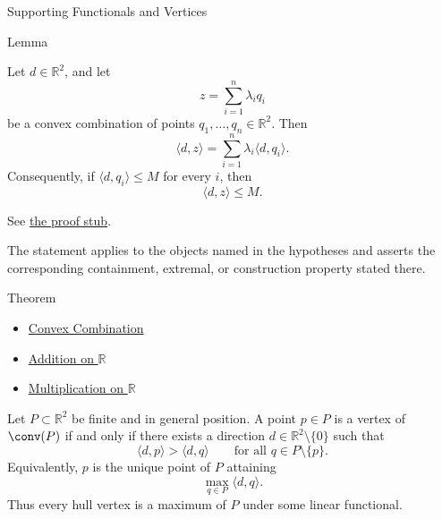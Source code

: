 \begin{topicbox}{Supporting Functionals and Vertices}
\NoLocalDependencies

\begin{lemmabox}{Lemma}
\begin{lemma}
\label{lem:computational-geometry-linear-functionals-convex-combinations}
Let \(d\in\mathbb{R}^2\), and let
\[
  z=\sum_{i=1}^{n}\lambda_i q_i
\]
be a convex combination of points \(q_1,\dots,q_n\in\mathbb{R}^2\). Then
\[
  \langle d,z\rangle
  =
  \sum_{i=1}^{n}\lambda_i\langle d,q_i\rangle.
\]
Consequently, if \(\langle d,q_i\rangle\le M\) for every \(i\), then
\[
  \langle d,z\rangle\le M.
\]
\end{lemma}
\end{lemmabox}\begin{remark*}[Proof]
See
\hyperref[prf:computational-geometry-linear-functionals-convex-combinations]{the proof stub}.
\end{remark*}

\begin{remark*}
The statement applies to the objects named in the hypotheses and asserts the
corresponding containment, extremal, or construction property stated there.
\end{remark*}

\begin{theorembox}{Theorem}

\begin{dependencies}
\begin{itemize}
  \item \hyperref[def:computational-geometry-convex-combination]{Convex Combination}
  \item \hyperref[def:addition-on-r]{Addition on $\mathbb{R}$}
  \item \hyperref[def:multiplication-on-r]{Multiplication on $\mathbb{R}$}
\end{itemize}
\end{dependencies}
\begin{theorem}
\label{thm:computational-geometry-supporting-functional-hull-vertices}
Let \(P\subset\mathbb{R}^2\) be finite and in general position. A point \(p\in P\)
is a vertex of \(\conv(P)\) if and only if there exists a direction
\(d\in\mathbb{R}^2\setminus\{0\}\) such that
\[
  \langle d,p\rangle>\langle d,q\rangle
  \qquad
  \text{for all } q\in P\setminus\{p\}.
\]
Equivalently, \(p\) is the unique point of \(P\) attaining
\[
  \max_{q\in P}\langle d,q\rangle.
\]
Thus every hull vertex is a maximum of \(P\) under some linear functional.
\end{theorem}
\end{theorembox}


\end{topicbox}
